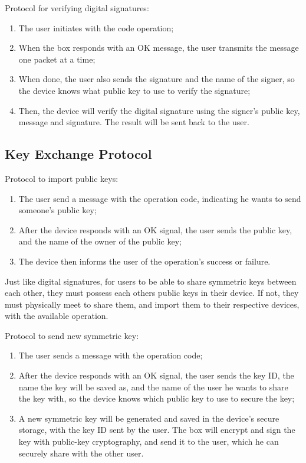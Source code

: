 Protocol for verifying digital signatures:
\begin{enumerate}
    \item The user initiates with the code operation;
    \item When the box responds with an OK message, the user transmits the message one packet at a time;
    \item When done, the user also sends the signature and the name of the signer, so the device knows what public key to use to verify the signature;
    \item Then, the device will verify the digital signature using the signer's public key, message and signature. The result will be sent back to the user.
\end{enumerate}

\subsection{Key Exchange Protocol} \label{chap:sol:protocol:key}

Protocol to import public keys:
\begin{enumerate}
    \item The user send a message with the operation code, indicating he wants to send someone's public key;
    \item After the device responds with an OK signal, the user sends the public key, and the name of the owner of the public key;
    \item The device then informs the user of the operation's success or failure.
\end{enumerate}

Just like digital signatures, for users to be able to share symmetric keys between each other, they must possess each others public keys in their device. If not, they must physically meet to share them, and import them to their respective devices, with the available operation.

Protocol to send new symmetric key:
\begin{enumerate}
    \item The user sends a message with the operation code;
    \item After the device responds with an OK signal, the user sends the key ID, the name the key will be saved as, and the name of the user he wants to share the key with, so the device knows which public key to use to secure the key;
    \item A new symmetric key will be generated and saved in the device's secure storage, with the key ID sent by the user. The box will encrypt and sign the key with public-key cryptography, and send it to the user, which he can securely share with the other user.
\end{enumerate}

